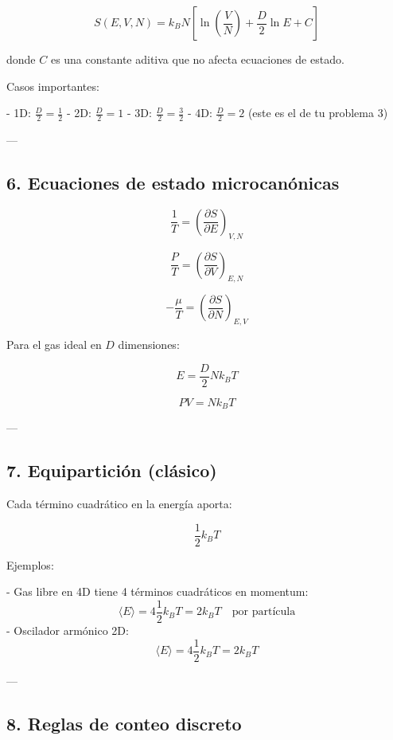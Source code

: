 \documentclass{article}
\begin{document}
\[
\boxed{
S(E,V,N) =
k_{B}N\left[
\ln\left(\frac{V}{N}\right)
+ \frac{D}{2}\ln E
+ C
\right]
}
\]

donde \(C\) es una constante aditiva que no afecta ecuaciones de estado.

Casos importantes:

- 1D: \(\frac{D}{2}= \frac{1}{2}\)
- 2D: \(\frac{D}{2}=1\)
- 3D: \(\frac{D}{2}=\frac{3}{2}\)
- 4D: \(\frac{D}{2}=2\)  (este es el de tu problema 3)

---

\subsection*{\textcolor{Apple Green}{6. Ecuaciones de estado microcanónicas}}

\[
\frac{1}{T} = \left(\frac{\partial S}{\partial E}\right)_{V,N}
\]

\[
\frac{P}{T} = \left(\frac{\partial S}{\partial V}\right)_{E,N}
\]

\[
-\frac{\mu}{T} = \left(\frac{\partial S}{\partial N}\right)_{E,V}
\]

Para el gas ideal en \(D\) dimensiones:

\[
\boxed{
E = \frac{D}{2} Nk_{B}T
}
\]

\[
\boxed{
PV = Nk_{B}T
}
\]

---

\subsection*{\textcolor{Apple Green}{7. Equipartición (clásico)}}

Cada término cuadrático en la energía aporta:

\[
\boxed{
\frac{1}{2}k_{B}T
}
\]

Ejemplos:

- Gas libre en 4D tiene 4 términos cuadráticos en momentum:
  \[
  \langle E \rangle = 4\frac{1}{2}k_{B}T = 2k_{B}T \quad \text{por partícula}
  \]
- Oscilador armónico 2D:
  \[
  \langle E \rangle = 4\frac{1}{2}k_{B}T = 2k_{B}T
  \]

---

\subsection*{\textcolor{Apple Green}{8. Reglas de conteo discreto}}
\end{document}
